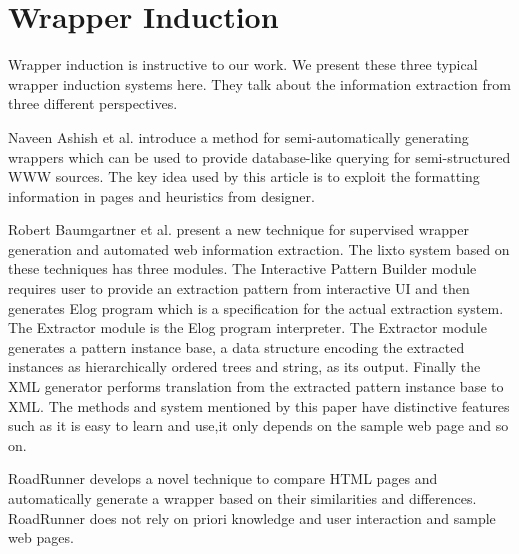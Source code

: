 \section{Wrapper Induction}

Wrapper induction \cite{AshishK97:WrapperGeneration}\cite{BaumgartnerFG01:Lixto}\cite{MeccaCM01:RoadRunner} is instructive to our work. We present these three typical wrapper induction systems here. They talk about the information extraction from three different perspectives.

Naveen Ashish et al. \cite{AshishK97:WrapperGeneration} introduce a method for semi-automatically generating wrappers which can be used to provide database-like querying for semi-structured WWW sources. The key idea used by this article is to exploit the formatting information in pages and heuristics from designer.

Robert Baumgartner et al.\cite{BaumgartnerFG01:Lixto} present a new technique for supervised wrapper generation and automated web information extraction.
The lixto system based on these techniques has three modules. The Interactive Pattern Builder module requires user to provide an extraction pattern from interactive UI and then generates Elog program which is a specification for the actual extraction system.
The Extractor module is the Elog program interpreter. The Extractor module generates a pattern instance base, a data structure encoding the extracted instances as hierarchically ordered trees and string, as its output. Finally the XML generator performs translation from the extracted pattern instance base to XML. The methods and system mentioned by this paper have distinctive features such as it is easy to learn and use,it only depends on the sample web page and so on.

RoadRunner \cite{MeccaCM01:RoadRunner} develops a novel technique to compare HTML pages and automatically generate a wrapper based on their similarities and differences. RoadRunner does not rely on priori knowledge and user interaction and sample web pages.

